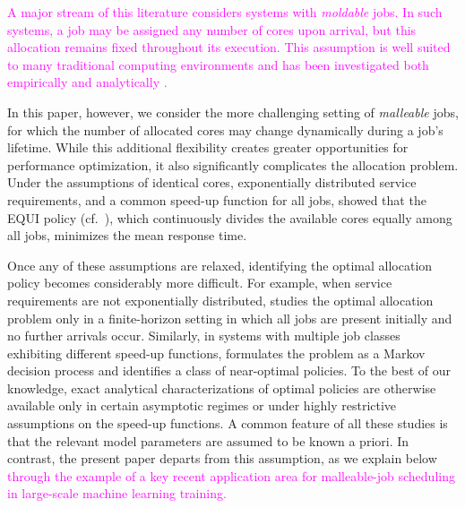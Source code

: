 \documentclass[11pt]{article}
\theoremstyle{remark}
\theoremstyle{definition}
\numberwithin{equation}{section}
\begin{document}
\textcolor{magenta}{A major stream of this literature considers systems with \emph{moldable} jobs. In such systems, a job may be assigned any number of cores upon arrival, but this allocation remains fixed throughout its execution. This assumption is well suited to many traditional computing environments and has been investigated both empirically \cite{cirne2001,cirne2002,huang2013} and analytically \cite{berg2017}.}

In this paper, however, we consider the more challenging setting of \emph{malleable} jobs, for which the number of allocated cores may change dynamically during a job's lifetime. While this additional flexibility creates greater opportunities for performance optimization, it also significantly complicates the allocation problem. Under the assumptions of identical cores, exponentially distributed service requirements, and a common speed-up function for all jobs, \cite{berg2017} showed that the EQUI policy (cf.\ \cite{edmonds2000}), which continuously divides the available cores equally among all jobs, minimizes the mean response time.

Once any of these assumptions are relaxed, identifying the optimal allocation policy becomes considerably more difficult. For example, when service requirements are not exponentially distributed, \cite{berg2020} studies the optimal allocation problem only in a finite-horizon setting in which all jobs are present initially and no further arrivals occur. Similarly, in systems with multiple job classes exhibiting different speed-up functions, \cite{berg2017} formulates the problem as a Markov decision process and identifies a class of near-optimal policies. To the best of our knowledge, exact analytical characterizations of optimal policies are otherwise available only in certain asymptotic regimes \cite{berg2024,li2026} or under highly restrictive assumptions on the speed-up functions.
A common feature of all these studies is that the relevant model parameters are assumed to be known a priori. In contrast, the present paper departs from this assumption, as we explain below \textcolor{magenta}{through the example of a key recent application area for malleable-job scheduling in large-scale machine learning training.}

\end{document}
